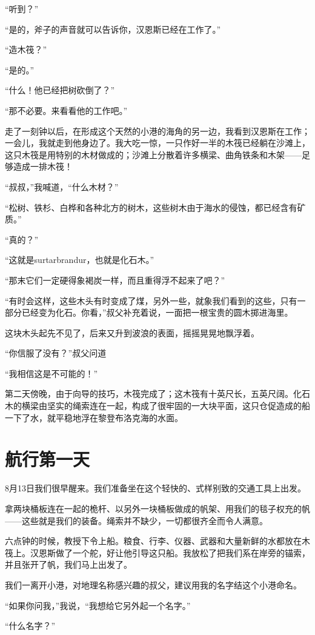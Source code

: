 \documentclass[10pt]{book}
\begin{document}
“听到？”

“是的，斧子的声音就可以告诉你，汉恩斯已经在工作了。”

“造木筏？”

“是的。”

“什么！他已经把树砍倒了？”

“那不必要。来看看他的工作吧。”

走了一刻钟以后，在形成这个天然的小港的海角的另一边，我看到汉恩斯在工作；一会儿，我就走到他身边了。我大吃一惊，一只作好一半的木筏已经躺在沙滩上，这只木筏是用特别的木材做成的；沙滩上分散着许多横梁、曲角铁条和木架——足够造成一排木筏！

“叔叔，”我喊道，“什么木材？”

“松树、铁杉、白桦和各种北方的树木，这些树木由于海水的侵蚀，都已经含有矿质。”

“真的？”

“这就是surtarbrandur，也就是化石木。”

“那末它们一定硬得象褐炭一样，而且重得浮不起来了吧？”

“有时会这样，这些木头有时变成了煤，另外一些，就象我们看到的这些，只有一部分已经变为化石。你看，”叔父补充着说，一面把一根宝贵的圆木掷进海里。

这块木头起先不见了，后来又升到波浪的表面，摇摇晃晃地飘浮着。

“你信服了没有？”叔父问道

“我相信这是不可能的！”

第二天傍晚，由于向导的技巧，木筏完成了；这木筏有十英尺长，五英尺阔。化石木的横梁由坚实的绳索连在一起，构成了很牢固的一大块平面，这只仓促造成的船一下了水，就平稳地浮在黎登布洛克海的水面。
\chapter{航行第一天}
8月13日我们很早醒来。我们准备坐在这个轻快的、式样别致的交通工具上出发。

拿两块桶板连在一起的桅杆、以另外一块桶板做成的帆架、用我们的毯子权充的帆——这些就是我们的装备。绳索并不缺少，一切都很齐全而令人满意。

六点钟的时候，教授下令上船。粮食、行李、仪器、武器和大量新鲜的水都放在木筏上。汉恩斯做了一个舵，好让他引导这只船。我放松了把我们系在岸旁的锚索，并且张开了帆，我们马上出发了。

我们一离开小港，对地理名称感兴趣的叔父，建议用我的名字结这个小港命名。

“如果你问我，”我说，“我想给它另外起一个名字。”

“什么名字？”
\end{document}
